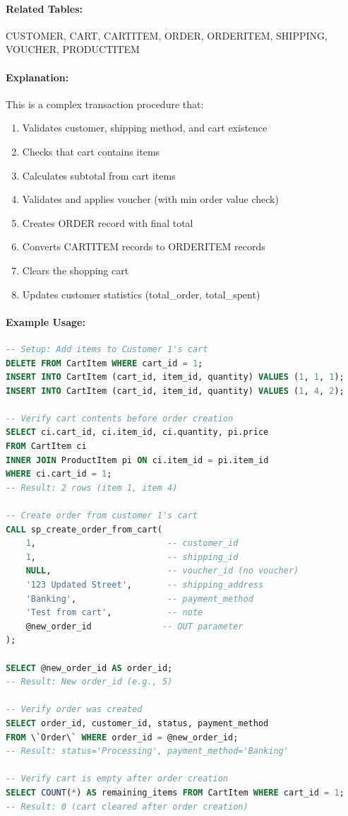 \paragraph{Related Tables:} CUSTOMER, CART, CARTITEM, ORDER, ORDERITEM, SHIPPING, VOUCHER, PRODUCTITEM

\paragraph{Explanation:}
This is a complex transaction procedure that:
\begin{enumerate}
    \item Validates customer, shipping method, and cart existence
    \item Checks that cart contains items
    \item Calculates subtotal from cart items
    \item Validates and applies voucher (with min order value check)
    \item Creates ORDER record with final total
    \item Converts CARTITEM records to ORDERITEM records
    \item Clears the shopping cart
    \item Updates customer statistics (total\_order, total\_spent)
\end{enumerate}

\paragraph{Example Usage:}

\begin{lstlisting}[language=SQL]
-- Setup: Add items to Customer 1's cart
DELETE FROM CartItem WHERE cart_id = 1;
INSERT INTO CartItem (cart_id, item_id, quantity) VALUES (1, 1, 1);
INSERT INTO CartItem (cart_id, item_id, quantity) VALUES (1, 4, 2);

-- Verify cart contents before order creation
SELECT ci.cart_id, ci.item_id, ci.quantity, pi.price 
FROM CartItem ci
INNER JOIN ProductItem pi ON ci.item_id = pi.item_id
WHERE ci.cart_id = 1;
-- Result: 2 rows (item 1, item 4)

-- Create order from customer 1's cart
CALL sp_create_order_from_cart(
    1,                          -- customer_id
    1,                          -- shipping_id
    NULL,                       -- voucher_id (no voucher)
    '123 Updated Street',       -- shipping_address
    'Banking',                  -- payment_method
    'Test from cart',           -- note
    @new_order_id              -- OUT parameter
);

SELECT @new_order_id AS order_id;
-- Result: New order_id (e.g., 5)

-- Verify order was created
SELECT order_id, customer_id, status, payment_method 
FROM \`Order\` WHERE order_id = @new_order_id;
-- Result: status='Processing', payment_method='Banking'

-- Verify cart is empty after order creation
SELECT COUNT(*) AS remaining_items FROM CartItem WHERE cart_id = 1;
-- Result: 0 (cart cleared after order creation)
\end{lstlisting}

